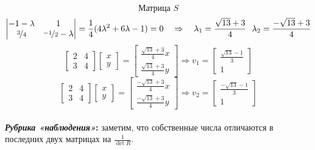 \documentclass[a3paper,14pt]{extarticle}
\begin{document}
$$\text{Матрица } S$$
$$\begin{vmatrix}
    -1-\lambda & 1 \\ \nicefrac{3}{4} & \nicefrac{-1}{2}-\lambda
\end{vmatrix} = \frac{1}{4}(4\lambda^2+6\lambda-1) = 0 \quad\Rightarrow\quad \lambda_1=\frac{\sqrt{13}+3}{4}\ \ \lambda_2=\frac{-\sqrt{13}+3}{4}$$
$$\begin{bmatrix}
    2 & 4 \\ 3 & 4
\end{bmatrix}\begin{bmatrix}
    x \\ y
\end{bmatrix} = \begin{bmatrix}
    \frac{\sqrt{13}+3}{4}x \\ \frac{\sqrt{13}+3}{4}y
\end{bmatrix} \Rightarrow v_1 = \begin{bmatrix}
    \frac{\sqrt{13}-1}{3} \\ 1
\end{bmatrix}$$
$$\begin{bmatrix}
    2 & 4 \\ 3 & 4
\end{bmatrix}\begin{bmatrix}
    x \\ y
\end{bmatrix} = \begin{bmatrix}
    \frac{-\sqrt{13}+3}{4}x \\ \frac{-\sqrt{13}+3}{4}y
\end{bmatrix} \Rightarrow v_2 = \begin{bmatrix}
    \frac{-\sqrt{13}-1}{3} \\ 1
\end{bmatrix}$$\,\\[0.5em]
\textbf{\textit{Рубрика «наблюдения»}:} заметим, что собственные числа отличаются в последних двух матрицах на $\frac{1}{\det{R}}$.
\end{document}
